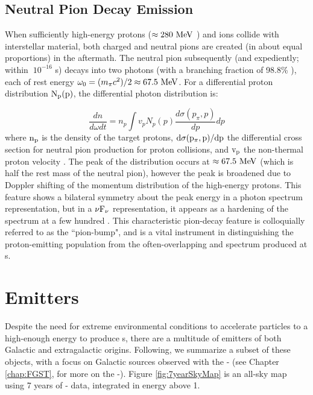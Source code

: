 

\subsection{Neutral Pion Decay Emission}\label{gamAstr:PP}
When sufficiently high-energy protons ($\approx 280~\mathrm{MeV}{}$ \cite{Dermer13}) and ions collide with interstellar material, both charged and neutral pions are created (in about equal proportions) in the aftermath. The neutral pion subsequently (and expediently; within $~10^{-16}$ s) decays into two \gam{} photons (with a branching fraction of 98.8\% \cite{Beringer12}), each of rest energy $\omega_0 =(m_{\pi}c^2)/2\approx 67.5~\mathrm{MeV}{}$. For a differential proton distribution ${\rm N_p(p)}$, the differential photon distribution is:

\begin{equation}
\frac{d n}{d \omega d t} = 
n_p \int v_p N_p(p) 
\frac{d \sigma(p_\pi, p)}{d p}dp
\end{equation}
where ${\rm n_p}$ is the density of the target protons, ${\rm d \sigma(p_\pi, p)/dp}$ the differential cross section for neutral pion production for proton collisions, and ${\rm v_p}$ the non-thermal proton velocity \citep{Hillier84,Dermer86,Aharonian00}. The peak of the distribution occurs at $\approx 67.5~\mathrm{MeV}{}$ (which is half the rest mass of the neutral pion), however the peak is broadened due to Doppler shifting of the momentum distribution of the high-energy protons. This feature shows a bilateral symmetry about the peak energy in a photon spectrum representation, but in a ${\rm \nu F_\nu}$ representation, it appears as a hardening of the spectrum at a few hundred\mev{} \cite{Stecker71,Dermer13}. This characteristic pion-decay feature is colloquially referred to as the ``pion-bump", and is a vital instrument in distinguishing the proton-emitting population from the often-overlapping \ic{} and \brems{} spectrum produced at \gam{}s. 

\section{\gam{} Emitters}\label{gamAstr:Sources}
Despite the need for extreme environmental conditions to accelerate particles to a high-enough energy to produce \gam{}s, there are a multitude of \gam{} emitters of both Galactic and extragalactic origins. Following, we summarize a subset of these \gam{} objects, with a focus on Galactic \gam{} sources observed with the \Fermi{}-\lat{}  (see Chapter \ref{chap:FGST}, for more on the \Fermi{}-\lat{}). Figure \ref{fig:7yearSkyMap} is an all-sky map using 7 years of  \Fermi{}-\lat{} data, integrated in energy above 1\gev{}. 

